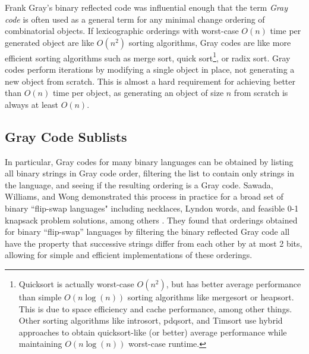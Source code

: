Frank Gray's binary reflected code was influential enough that the term \emph{Gray code} is often used as a general term for any minimal change ordering of combinatorial objects.  If lexicographic orderings with worst-case $O(n)$ time per generated object are like $O(n^2)$ sorting algorithms, Gray codes are like more efficient sorting algorithms such as merge sort, quick sort\footnote{Quicksort is actually worst-case $O(n^2)$, but has better average performance than simple $O(n \log(n))$ sorting algorithms like mergesort or heapsort.  This is due to space efficiency and cache performance, among other things.  Other sorting algorithms like introsort, pdqsort, and Timsort use hybrid approaches to obtain quicksort-like (or better) average performance while maintaining $O(n \log(n))$ worst-case runtime.}, or radix sort.  Gray codes perform iterations by modifying a single object in place, not generating a new object from scratch.  This is almost a hard requirement for achieving better than $O(n)$ time per object, as generating an object of size $n$ from scratch is always at least $O(n)$.


\subsection{Gray Code Sublists}
In particular, Gray codes for many binary languages can be obtained by listing all binary strings in Gray code order, filtering the list to contain only strings in the language, and seeing if the resulting ordering is a Gray code.  Sawada, Williams, and Wong demonstrated this process in practice for a broad set of binary ``flip-swap languages" including necklaces, Lyndon words, and feasible 0-1 knapsack problem solutions, among others \cite{sawada2021inside}.  They found that orderings obtained for binary ``flip-swap'' languages by filtering the binary reflected Gray code all have the property that successive strings differ from each other by at most 2 bits, allowing for simple and efficient implementations of these orderings.



